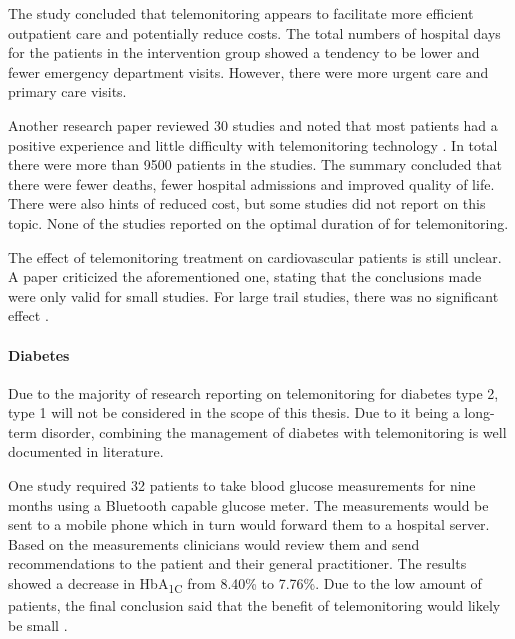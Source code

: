         The study concluded that telemonitoring appears to facilitate more efficient outpatient care and potentially reduce costs. The total numbers of hospital days for the patients in the intervention group showed a tendency to be lower and fewer emergency department visits. However, there were more urgent care and primary care visits.

        Another research paper reviewed 30 studies and noted that most patients had a positive experience and little difficulty with telemonitoring technology \cite{inglis2010structured}. In total there were more than 9500 patients in the studies. The summary concluded that there were fewer deaths, fewer hospital admissions and improved quality of life. There were also hints of reduced cost, but some studies did not report on this topic. None of the studies reported on the optimal duration of for telemonitoring.
        
        The effect of telemonitoring treatment on cardiovascular patients is still unclear. A paper criticized the aforementioned one, stating that the conclusions made were only valid for small studies. For large trail studies, there was no significant effect \cite{chaudhry2010telemonitoring}.

        \paragraph{Diabetes} Due to the majority of research reporting on telemonitoring for diabetes type 2, type 1 will not be considered in the scope of this thesis. Due to it being a long-term disorder, combining the management of diabetes with telemonitoring is well documented in literature.

        One study required 32 patients to take blood glucose measurements for nine months using a Bluetooth capable glucose meter. The measurements would be sent to a mobile phone which in turn would forward them to a hospital server. Based on the measurements clinicians would review them and send recommendations to the patient and their general practitioner. The results showed a decrease in HbA\textsubscript{1C} from 8.40\% to 7.76\%. Due to the low amount of patients, the final conclusion said that the benefit of telemonitoring would likely be small \cite{istepanian2009evaluation}.

